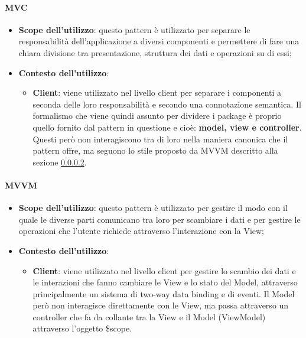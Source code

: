 		\paragraph{MVC} %
		\label{par:mvc}
			\begin{itemize}
				\item \textbf{Scope dell'utilizzo}: questo pattern è utilizzato per separare le responsabilità dell’applicazione a diversi componenti e permettere di fare una chiara divisione tra presentazione, struttura dei dati e operazioni su di essi;

				\item \textbf{Contesto dell'utilizzo}: 
					\begin{itemize}
						\item \textbf{Client}: viene utilizzato nel livello client per separare i componenti a seconda delle loro responsabilità e secondo una connotazione semantica. Il formalismo che viene quindi assunto per dividere i package è proprio quello fornito dal pattern in questione e cioè: \textbf{model, view e controller}. Questi però non interagiscono tra di loro nella maniera canonica che il pattern offre, ma seguono lo stile proposto da MVVM descritto alla sezione \ref{par:mvvm}.
					\end{itemize}
			\end{itemize}

		\paragraph{MVVM} %
		\label{par:mvvm}
			\begin{itemize}
				\item \textbf{Scope dell'utilizzo}: questo pattern è utilizzato per gestire il modo con il quale le diverse parti comunicano tra loro per scambiare i dati e per gestire le operazioni che l'utente richiede attraverso l'interazione con la View;

				\item \textbf{Contesto dell'utilizzo}: 
					\begin{itemize}
						\item \textbf{Client}: viene utilizzato nel livello client per gestire lo scambio dei dati e le interazioni che fanno cambiare le View e lo stato del Model, attraverso principalmente un sistema di two-way data binding e di eventi. Il Model però non interagisce direttamente con le View, ma passa attraverso un controller che fa da collante tra la View e il Model (ViewModel) attraverso l'oggetto \$scope.
					\end{itemize}
			\end{itemize}

